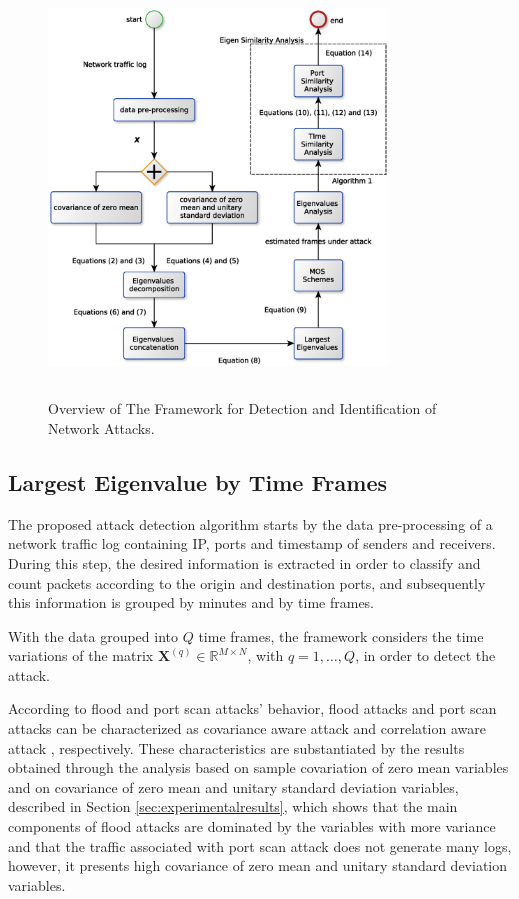 \documentclass[review]{elsarticle}
\begin{document}
\begin{figure}[h!]
	\centering
     \includegraphics[height=11cm, width=9cm]{results/figures/mos_eigen_similarity.eps}
     \caption{Overview of The Framework for Detection and Identification of Network Attacks.}
     \label{fig:fig80}
\end{figure}

\subsection{Largest Eigenvalue by Time Frames}
\label{sec:prop_LargestEigenvaluebyTimeFrames}

The proposed attack detection algorithm starts by the data pre-processing of a network traffic log containing IP, ports and timestamp of senders and receivers. During this step, the desired information is extracted in order to classify and count packets according to the origin and destination ports, and subsequently this information is grouped by minutes and by time frames.

With the data grouped into $Q$ time frames, the framework considers the time variations of the matrix $\boldsymbol{X}^{(q)} \in \mathbb{R}^{M\times{N}}$, with $q = 1, \ldots, Q$, in order to detect the attack. 

According to flood and port scan attacks' behavior, flood attacks and port scan attacks can be characterized as covariance aware attack \citep{jin2004covariance} and correlation aware attack \citep{lakhina2005mining}, respectively. These characteristics are substantiated by the results obtained through the analysis based on sample covariation of zero mean variables and on covariance of zero mean and unitary standard deviation variables, described in Section \ref{sec:experimentalresults}, which shows that the main components of flood attacks are dominated by the variables with more variance and that the traffic associated with port scan attack does not generate many logs, however, it presents high covariance of zero mean and unitary standard deviation variables.
\end{document}
